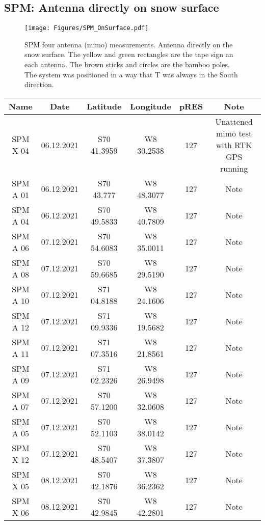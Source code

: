 \documentclass[a4paper,12pt]{article}
\begin{document}
\subsection{SPM: Antenna directly on snow surface}
\begin{figure}[H]
	\texttt{[image: Figures/SPM\_OnSurface.pdf]}
	\caption{SPM four antenna (mimo) measurements. Antenna directly on the snow surface.
  The yellow and green rectangles are the tape sign an each antenna. 
  The brown sticks and circles are the bamboo poles.
  The system was positioned in a way that T was always in the South direction.}
	\label{fig_SPM_surface}
\end{figure}

\begin{table}[H]
  \tiny
  \centering
  \begin{tabular}[width=\textwidth]{c c c c c c}
    \rowcolor{gray!50}
    Name & Date & Latitude & Longitude & pRES & Note\\
    \hline
    SPM X 04 & 06.12.2021 & S70 41.3959 & W8 30.2538 & 127 & Unattened mimo test with RTK GPS running \\ 
    SPM A 01 & 06.12.2021 & S70 43.777 & W8 48.3077 & 127 & Note \\
    SPM A 04 & 06.12.2021 & S70 49.5833 & W8 40.7809 & 127 & Note \\
    SPM A 06 & 07.12.2021 & S70 54.6083 & W8 35.0011 & 127 & Note \\
    SPM A 08 & 07.12.2021 & S70 59.6685 & W8 29.5190 & 127 & Note \\
    SPM A 10 & 07.12.2021 & S71 04.8188 & W8 24.1606 & 127 & Note \\
    SPM A 12 & 07.12.2021 & S71 09.9336 & W8 19.5682 & 127 & Note \\
    SPM A 11 & 07.12.2021 & S71 07.3516 & W8 21.8561 & 127 & Note \\
    SPM A 09 & 07.12.2021 & S71 02.2326 & W8 26.9498 & 127 & Note \\
    SPM A 07 & 07.12.2021 & S70 57.1200 & W8 32.0608 & 127 & Note \\
    SPM A 05 & 07.12.2021 & S70 52.1103 & W8 38.0142 & 127 & Note \\
    SPM X 12 & 07.12.2021 & S70 48.5407 & W8 37.3807 & 127 & Note \\
    SPM X 05 & 08.12.2021 & S70 42.1876 & W8 36.2362 & 127 & Note \\
    SPM X 06 & 08.12.2021 & S70 42.9845 & W8 42.2801 & 127 & Note \\

\end{tabular}
\end{table}
\end{document}
